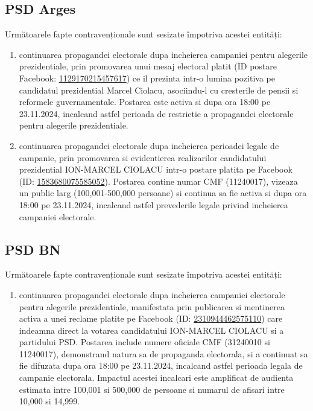 \documentclass[a4paper,12pt]{article}
\begin{document}
\vspace{0.5cm}

\subsection{PSD Arges}
Următoarele fapte contravenționale sunt sesizate împotriva acestei entități:

\begin{enumerate}[leftmargin=*, label=\arabic*.)]
    \item continuarea propagandei electorale dupa incheierea campaniei pentru alegerile prezidentiale, prin promovarea unui mesaj electoral platit (ID postare Facebook: \href{https://www.facebook.com/ads/library/?id=1129170215457617}{1129170215457617}) ce il prezinta intr-o lumina pozitiva pe candidatul prezidential Marcel Ciolacu, asociindu-l cu cresterile de pensii si reformele guvernamentale. Postarea este activa si dupa ora 18:00 pe 23.11.2024, incalcand astfel perioada de restrictie a propagandei electorale pentru alegerile prezidentiale.
    \item continuarea propagandei electorale dupa incheierea perioadei legale de campanie, prin promovarea si evidentierea realizarilor candidatului prezidential ION-MARCEL CIOLACU intr-o postare platita pe Facebook (ID: \href{https://www.facebook.com/ads/library/?id=1583680075585052}{1583680075585052}). Postarea contine numar CMF (11240017), vizeaza un public larg (100,001-500,000 persoane) si continua sa fie activa si dupa ora 18:00 pe 23.11.2024, incalcand astfel prevederile legale privind incheierea campaniei electorale.
\end{enumerate}

\vspace{0.5cm}

\subsection{PSD BN}
Următoarele fapte contravenționale sunt sesizate împotriva acestei entități:

\begin{enumerate}[leftmargin=*, label=\arabic*.)]
    \item continuarea propagandei electorale dupa incheierea campaniei electorale pentru alegerile prezidentiale, manifestata prin publicarea si mentinerea activa a unei reclame platite pe Facebook (ID: \href{https://www.facebook.com/ads/library/?id=2310944462575110}{2310944462575110}) care indeamna direct la votarea candidatului ION-MARCEL CIOLACU si a partidului PSD. Postarea include numere oficiale CMF (31240010 si 11240017), demonstrand natura sa de propaganda electorala, si a continuat sa fie difuzata dupa ora 18:00 pe 23.11.2024, incalcand astfel perioada legala de campanie electorala. Impactul acestei incalcari este amplificat de audienta estimata intre 100,001 si 500,000 de persoane si numarul de afisari intre 10,000 si 14,999.
\end{enumerate}
\end{document}
